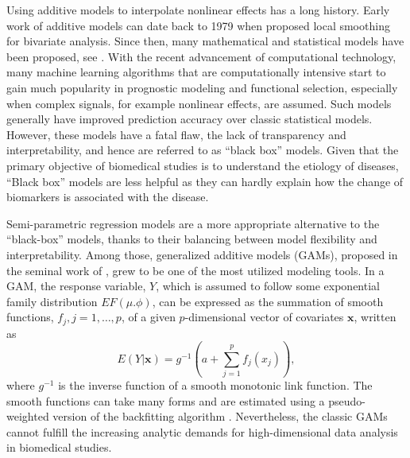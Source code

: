 \documentclass[AMA,STIX1COL,]{WileyNJD-v2}
\begin{document}
Using additive models to interpolate nonlinear effects has a long
history. Early work of additive models can date back to 1979 when
\citet{Cleveland1979} proposed local smoothing for bivariate analysis.
Since then, many mathematical and statistical models have been proposed,
see \citet{Wood2020}. With the recent advancement of computational
technology, many machine learning algorithms that are computationally
intensive start to gain much popularity in prognostic modeling and
functional selection, especially when complex signals, for example
nonlinear effects, are assumed. Such models generally have improved
prediction accuracy over classic statistical models. However, these
models have a fatal flaw, the lack of transparency and interpretability,
and hence are referred to as ``black box'' models. Given that the
primary objective of biomedical studies is to understand the etiology of
diseases, ``Black box'' models are less helpful as they can hardly
explain how the change of biomarkers is associated with the disease.

Semi-parametric regression models are a more appropriate alternative to
the ``black-box'' models, thanks to their balancing between model
flexibility and interpretability. Among those, generalized additive
models (GAMs), proposed in the seminal work of \citet{Hastie1987}, grew
to be one of the most utilized modeling tools. In a GAM, the response
variable, \(Y\), which is assumed to follow some exponential family
distribution \(EF(\mu. \phi)\), can be expressed as the summation of
smooth functions, \(f_j, j = 1, \dots, p\), of a given \(p\)-dimensional
vector of covariates \(\boldsymbol{x}\), written as \[
E(Y|\boldsymbol{x}) = g^{-1}(a + \sum\limits^p_{j=1}f_j(x_j)),
\] where \(g^{-1}\) is the inverse function of a smooth monotonic link
function. The smooth functions can take many forms and are estimated
using a pseudo-weighted version of the backfitting algorithm
\citep{Breiman1985}. Nevertheless, the classic GAMs cannot fulfill the
increasing analytic demands for high-dimensional data analysis in
biomedical studies.
\end{document}
